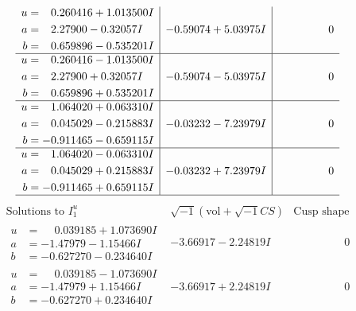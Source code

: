 \documentclass[1p]{elsarticle_modified}
\theoremstyle{definition}
\newcommand{\I}{\sqrt{-1}}
\begin{document}
$$\begin{array}{c|c|c}
\begin{aligned}
u &= \phantom{-}0.260416 + 1.013500 I \\
a &= \phantom{-}2.27900 - 0.32057 I \\
b &= \phantom{-}0.659896 - 0.535201 I\end{aligned}
 & -0.59074 + 5.03975 I & \phantom{-0.000000 } 0 \\ \hline\begin{aligned}
u &= \phantom{-}0.260416 - 1.013500 I \\
a &= \phantom{-}2.27900 + 0.32057 I \\
b &= \phantom{-}0.659896 + 0.535201 I\end{aligned}
 & -0.59074 - 5.03975 I & \phantom{-0.000000 } 0 \\ \hline\begin{aligned}
u &= \phantom{-}1.064020 + 0.063310 I \\
a &= \phantom{-}0.045029 - 0.215883 I \\
b &= -0.911465 - 0.659115 I\end{aligned}
 & -0.03232 - 7.23979 I & \phantom{-0.000000 } 0 \\ \hline\begin{aligned}
u &= \phantom{-}1.064020 - 0.063310 I \\
a &= \phantom{-}0.045029 + 0.215883 I \\
b &= -0.911465 + 0.659115 I\end{aligned}
 & -0.03232 + 7.23979 I & \phantom{-0.000000 } 0\\
 \hline 
 \end{array}$$\newpage$$\begin{array}{c|c|c}  
\text{Solutions to }I^u_{1}& \I (\text{vol} + \sqrt{-1}CS) & \text{Cusp shape}\\
 \hline 
\begin{aligned}
u &= \phantom{-}0.039185 + 1.073690 I \\
a &= -1.47979 - 1.15466 I \\
b &= -0.627270 - 0.234640 I\end{aligned}
 & -3.66917 - 2.24819 I & \phantom{-0.000000 } 0 \\ \hline\begin{aligned}
u &= \phantom{-}0.039185 - 1.073690 I \\
a &= -1.47979 + 1.15466 I \\
b &= -0.627270 + 0.234640 I\end{aligned}
 & -3.66917 + 2.24819 I & \phantom{-0.000000 } 0 \\ \hline\begin{aligned}

\end{aligned}
\end{array}$$
\end{document}
